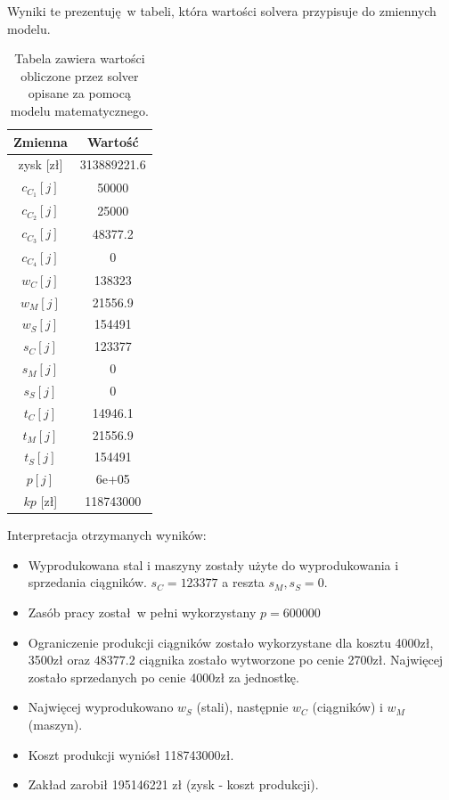 \documentclass{article}
\begin{document}
Wyniki te prezentuję w tabeli, która wartości solvera przypisuje do zmiennych modelu.

\begin{table}[H]
  \begin{center}
    \begin{tabular}{|c | c| }
      \hline
      Zmienna & Wartość \\ 
      \hline
      zysk [zł] & 313889221.6 \\
      \hline
      $c_C_1 [j]$& 50000\\
      \hline
      $c_C_2 [j]$&          25000 \\
      \hline
      $c_C_3 [j]$&       48377.2 \\
      \hline
      $c_C_4 [j]$&        0 \\
      \hline
      $w_C [j]$&        138323 \\
      \hline
      $w_M [j]$&         21556.9 \\
      \hline
      $w_S [j]$&        154491 \\
      \hline
      $s_C [j]$&        123377 \\
      \hline
      $s_M [j]$&             0 \\
      \hline
      $s_S [j]$&             0 \\
      \hline
      $t_C [j]$&         14946.1 \\
      \hline
      $t_M [j]$&         21556.9 \\
      \hline
      $t_S [j]$&        154491 \\
      \hline
      $p [j]$&                6e+05 \\
      \hline
      $kp$ [zł] &  118743000 \\
      \hline
    \end{tabular} 
    \caption{\label{table:setka}Tabela zawiera wartości obliczone przez solver opisane za pomocą modelu matematycznego.}
  \end{center}
\end{table}

Interpretacja otrzymanych wyników:

\begin{itemize}
  \item Wyprodukowana stal i maszyny zostały użyte do wyprodukowania i sprzedania ciągników. $s_C = 123377$ a reszta $s_M , s_S = 0$.
  \item Zasób pracy został w pełni wykorzystany $p = 600000$
  \item Ograniczenie produkcji ciągników zostało wykorzystane dla kosztu 4000zł, 3500zł oraz $48377.2$ ciągnika zostało wytworzone po cenie 2700zł. Najwięcej zostało sprzedanych po cenie 4000zł za jednostkę.
  \item Najwięcej wyprodukowano $w_S$ (stali), następnie $w_C$ (ciągników) i $w_M$ (maszyn).
  \item Koszt produkcji wyniósł 118743000zł.
  \item Zakład zarobił 195146221 zł (zysk - koszt produkcji).
\end{itemize}
\end{document}
